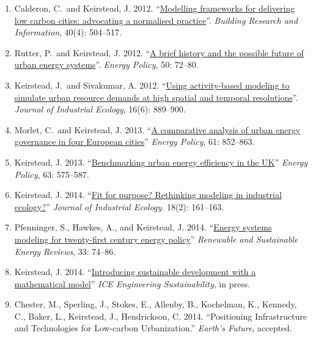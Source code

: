 \documentclass[11pt,a4paper]{article}
\begin{document}
\begin{enumerate}
\item Calderon, C.\  and Keirstead, J. 2012. ``\href{http://dx.doi.org/10.1080/09613218.2012.680702}{Modelling frameworks for delivering low carbon cities: advocating a normalised practice}''. \emph{Building Research and Information}, 40(4): 504--517.

\item Rutter, P.\ and Keirstead, J.  2012. ``\href{http://dx.doi.org/10.1016/j.enpol.2012.03.072}{A brief history and the possible future of urban energy systems}''. \emph{Energy Policy}, 50: 72--80.

\item Keirstead, J.\  and Sivakumar, A. 2012. ``\href{http://dx.doi.org/10.1111/j.1530-9290.2012.00486.x}{Using activity-based modeling to simulate urban resource demands at high spatial and temporal resolutions}''. \emph{Journal of Industrial Ecology}, 16(6): 889--900.

\item Morlet, C.\ and Keirstead, J. 2013. ``\href{http://dx.doi.org/10.1016/j.enpol.2013.06.085}{A comparative analysis of urban energy governance in four European cities}'' \emph{Energy Policy}, 61: 852--863.

\item Keirstead, J. 2013. ``\href{http://dx.doi.org/10.1016/j.enpol.2013.08.063}{Benchmarking urban energy efficiency in the UK}'' \emph{Energy Policy}, 63: 575--587.\label{paper:benchmarking}

\item Keirstead, J. 2014. ``\href{http://dx.doi.org/10.1111/jiec.12093}{Fit for purpose? Rethinking modeling in industrial ecology?}'' \emph{Journal of Industrial Ecology}. 18(2): 161--163.

\item Pfenninger, S., Hawkes, A., and Keirstead, J. 2014. ``\href{http://dx.doi.org/10.1016/j.rser.2014.02.003}{Energy systems modeling for twenty-first century energy policy}'' \emph{Renewable and Sustainable Energy Reviews}, 33: 74--86.

\item Keirstead, J.  2014.  ``\href{http://dx.doi.org/10.1680/ensu.13.00036}{Introducing sustainable development with a mathematical model}'' \emph{ICE Engineering Sustainability}, in press.

\item Chester, M., Sperling, J., Stokes, E., Allenby, B., Kochelman, K., Kennedy, C., Baker, L., Keirstead, J., Hendrickson, C. 2014. ``Positioning Infrastructure and Technologies for Low-carbon Urbanization.'' \emph{Earth's Future}, accepted.


\end{enumerate}
\end{document}
